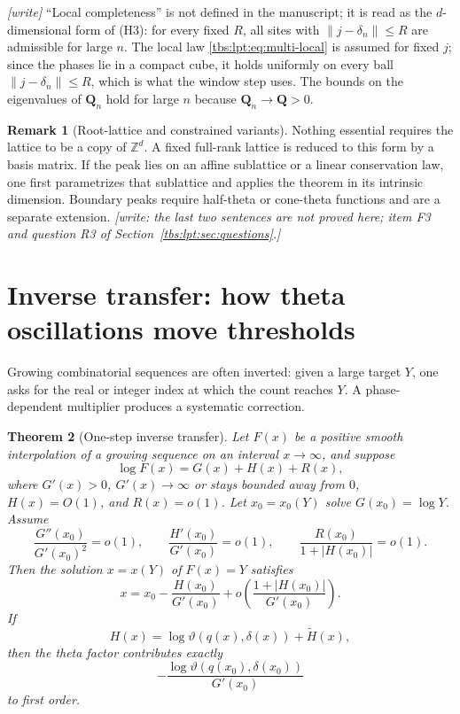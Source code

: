 \documentclass[11pt,a4paper]{article}
\numberwithin{equation}{section}
\newtheorem{theorem}{Theorem}[section]
\theoremstyle{definition}
\newtheorem{remark}[theorem]{Remark}
\newcommand{\Z}{\mathbb Z}
\begin{document}
\emph{[write]} ``Local completeness'' is not defined in the manuscript;
it is read as the $d$-dimensional form of (H3): for every fixed $R$, all
sites with $\|j-\delta_n\|\le R$ are admissible for large $n$. The local
law \eqref{tbs:lpt:eq:multi-local} is assumed for fixed $j$; since the
phases lie in a compact cube, it holds uniformly on every ball
$\|j-\delta_n\|\le R$, which is what the window step uses. The bounds on
the eigenvalues of $\mathbf Q_n$ hold for large $n$ because
$\mathbf Q_n\to\mathbf Q>0$.

\begin{remark}[Root-lattice and constrained variants]\label{tbs:lpt:rem:variants}
Nothing essential requires the lattice to be a copy of $\Z^d$. A fixed
full-rank lattice is reduced to this form by a basis matrix. If the peak
lies on an affine sublattice or a linear conservation law, one first
parametrizes that sublattice and applies the theorem in its intrinsic
dimension. Boundary peaks require half-theta or cone-theta functions and
are a separate extension. \emph{[write: the last two sentences are not
proved here; item F3 and question R3 of
Section~\ref{tbs:lpt:sec:questions}.]}
\end{remark}

\section{Inverse transfer: how theta oscillations move thresholds}\label{tbs:lpt:sec:inverse}

Growing combinatorial sequences are often inverted: given a large target
$Y$, one asks for the real or integer index at which the count reaches
$Y$. A phase-dependent multiplier produces a systematic correction.

\begin{theorem}[One-step inverse transfer]\label{tbs:lpt:thm:inverse}
Let $F(x)$ be a positive smooth interpolation of a growing sequence on an
interval $x\to\infty$, and suppose
\begin{equation}\label{tbs:lpt:eq:logF}
 \log F(x)=G(x)+H(x)+R(x),
\end{equation}
where $G'(x)>0$, $G'(x)\to\infty$ or stays bounded away from $0$,
$H(x)=O(1)$, and $R(x)=o(1)$. Let $x_0=x_0(Y)$ solve $G(x_0)=\log Y$.
Assume
\begin{equation}\label{tbs:lpt:eq:inverse-regularity}
 \frac{G''(x_0)}{G'(x_0)^2}=o(1),\qquad
 \frac{H'(x_0)}{G'(x_0)}=o(1),\qquad
 \frac{R(x_0)}{1+|H(x_0)|}=o(1).
\end{equation}
Then the solution $x=x(Y)$ of $F(x)=Y$ satisfies
\begin{equation}\label{tbs:lpt:eq:inverse-correction}
 x=x_0-\frac{H(x_0)}{G'(x_0)}
 +o\!\left(\frac{1+|H(x_0)|}{G'(x_0)}\right).
\end{equation}
If
\[
 H(x)=\log\vartheta(q(x),\delta(x))+\tilde H(x),
\]
then the theta factor contributes exactly
\begin{equation}\label{tbs:lpt:eq:theta-inverse}
 -\frac{\log\vartheta(q(x_0),\delta(x_0))}{G'(x_0)}
\end{equation}
to first order.
\end{theorem}
\end{document}

